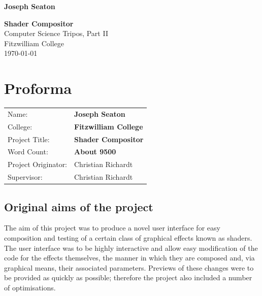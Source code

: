\documentclass[12pt,twoside,notitlepage]{report}
\begin{document}


\newcommand{\name}{Joseph Seaton}
\newcommand{\college}{Fitzwilliam College}
\newcommand{\ptitle}{Shader Compositor}

\setcounter{page}{1}
\pagestyle{plain}



\pagestyle{empty}

\hfill{\LARGE \bf \name}

\vspace*{60mm}
\begin{center}
\Huge
{\bf \ptitle} \\
\vspace*{5mm}
Computer Science Tripos, Part II\\
\vspace*{5mm}
\college \\
\vspace*{5mm}
\today  %
\end{center}

\cleardoublepage




\chapter*{Proforma}

{\large
\begin{tabular}{@{\hspace{0em}}ll}
Name:               & \bf \name    \\
College:            & \bf \college \\
Project Title:      & \bf \ptitle  \\
Word Count:         & \bf About 9500 \\
Project Originator: & Christian Richardt                    \\
Supervisor:         & Christian Richardt                    \\ 
\end{tabular}
}


\section*{Original aims of the project}
The aim of this project was to produce a novel user interface for easy composition and testing of a certain class of graphical effects known as shaders. The user interface was to be highly interactive and allow easy modification of the code for the effects themselves, the manner in which they are composed and, via graphical means, their associated parameters. Previews of these changes were to be provided as quickly as possible; therefore the project also included a number of optimisations.
\end{document}
